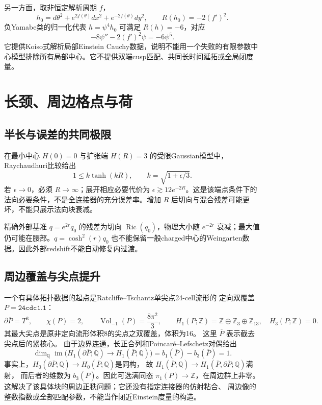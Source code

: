\documentclass[UTF8,a4paper,11pt,fontset=fandol]{ctexart}
\numberwithin{equation}{section}
\theoremstyle{definition}
\newcommand{\Ric}{\operatorname{Ric}}
\newcommand{\Vol}{\operatorname{Vol}}
\newcommand{\Z}{\mathbb Z}
\begin{document}
另一方面，取非恒定解析周期 $f$，
\[
h_0=d\theta^2+e^{2f(\theta)}dx^2+e^{-2f(\theta)}dy^2,
\qquad R(h_0)=-2(f')^2.
\]
负Yamabe类的归一化代表 $h=\psi^4h_0$ 可满足 $R(h)=-6$，对应
\[
-8\psi''-2(f')^2\psi=-6\psi^5.
\]
它提供Koiso式解析局部Einstein Cauchy数据，说明不能用一个失败的有限参数中心模型排除所有局部中心。它不提供双端cusp匹配、共同长时间延拓或全局闭度量。

\section{长颈、周边格点与荷}
\subsection{半长与误差的共同极限}
在最小中心 $H(0)=0$ 与扩张端 $H(R)=3$ 的受限Gaussian模型中，Raychaudhuri比较给出
\[
1\le k\tanh(kR),\qquad k=\sqrt{1+\epsilon/3}.
\]
若 $\epsilon\to0$，必须 $R\to\infty$；展开相应必要代价为 $\epsilon\gtrsim12e^{-2R}$。这是该端点条件下的法向必要条件，不是全连接器的充分误差率。增加 $R$ 后切向与混合残差可能更坏，不能只展示法向块衰减。

精确外部基准 $q=e^{2r}q_0$ 的残差为切向 $\Ric(q_0)$，物理大小随 $e^{-2r}$ 衰减；最大值仍可能在腰部。$q=\cosh^2(r)q_0$ 也不能保留一般charged中心的Weingarten数据。因此外部redshift不能自动修复内过渡。

\subsection{周边覆盖与尖点提升}
一个有具体拓扑数据的起点是Ratcliffe--Tschantz单尖点24-cell流形的
定向双覆盖 $P=\texttt{24cdc1.1}$\cite[\S\S9,11, Table 2]{RT24}：
\[
 \partial\overline P=T^3,\qquad \chi(P)=2,\qquad
 \Vol_{-1}(P)=\frac{8\pi^2}{3},\qquad
 H_1(P;\Z)=\Z\oplus\Z_3\oplus\Z_{13},\quad H_3(P;\Z)=0.
\]
其最大尖点是原非定向流形体积8的尖点之双覆盖，体积为16。
这里 $\overline P$ 表示截去尖点后的紧核心。
由于边界连通，长正合列和Poincar\'e--Lefschetz对偶给出
\begin{equation}\label{eq:peripheral-rank}
 \dim_{\mathbb Q}\operatorname{im}\bigl(H_1(\partial\overline P;\mathbb Q)
        \longrightarrow H_1(\overline P;\mathbb Q)\bigr)
 =b_1(\overline P)-b_3(\overline P)=1.
\end{equation}
事实上，$H_0(\partial\overline P;\mathbb Q)\to H_0(\overline P;\mathbb Q)$是同构，
故 $H_1(\overline P;\mathbb Q)\to H_1(\overline P,\partial\overline P;\mathbb Q)$满射，
而后者的维数为 $b_3(\overline P)$。因此可选满同态
$\pi_1(P)\to\Z$，在周边群上非零。
这解决了该具体块的周边正秩问题；它还没有指定连接器的仿射粘合、
周边像的整数指数或全部匹配参数，不能当作闭近Einstein度量的构造。
\end{document}
